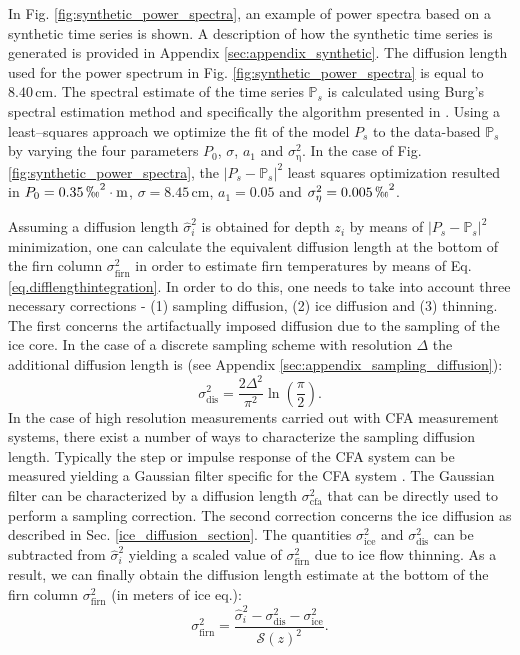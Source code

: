 \documentclass[11pt, draftcls, onecolumn]{IEEEtran} %
\numberwithin{equation}{section}
\numberwithin{table}{section}
\numberwithin{figure}{section}
\begin{document}
In Fig. \ref{fig:synthetic_power_spectra}, an example of power spectra based on a synthetic time series is shown. 
A description of how the synthetic time series is generated is provided in Appendix \ref{sec:appendix_synthetic}.
The diffusion length used for the power spectrum in Fig. \ref{fig:synthetic_power_spectra} is equal to $8.40 \, \mathrm{cm}$.
The spectral estimate of the time series $\mathbb{P}_s$ 
is calculated using Burg's spectral estimation method
\citep{Kay1981} and specifically the algorithm presented in \cite{Andersen1974}. 
Using a least--squares approach we optimize the fit of the model $P_s$ to the data-based $\mathbb{P}_s$ by varying the four 
parameters $P_0$, $\sigma$, $a_1$ and $\sigma_{\mathrm{\eta}}^2$.
In the case of Fig. \ref{fig:synthetic_power_spectra},
the $\vert P_s - \mathbb{P}_s \vert^2$ least squares optimization resulted in 
$P_0=0.35\,\permil^2\cdot \mathrm{m}$, $\sigma = 8.45 \, \mathrm{cm}$, $a_1 = 0.05$ and $\sigma_{\mathrm{\eta}}^2 =0.005 \, \permil^2$.


Assuming a diffusion length $\widehat{\sigma}_i^2$ is obtained for depth $z_i$ by means of 
$\vert P_s - \mathbb{P}_s \vert^2$ minimization, one can calculate the equivalent diffusion 
length at the bottom of the firn column $\sigma^2_{\mathrm{firn}}$ in order to estimate firn temperatures
by means of Eq. \ref{eq.difflengthintegration}. 
In order to do this, one needs to take into account three necessary corrections
- (1) sampling diffusion, (2) ice diffusion and (3) thinning. 
The first concerns the artifactually imposed
diffusion due to the sampling of the ice core. 
In the case of a discrete sampling scheme with resolution $\Delta$ the additional 
diffusion length is (see Appendix \ref{sec:appendix_sampling_diffusion}): 
\begin{equation}
\sigma^2_{\mathrm{dis}} = \frac{2\Delta^2}{\pi^2}\ln{\left(\frac{\pi}{2}\right)}.
\label{sampling_sigma}
\end{equation}
In the case of high resolution measurements carried out with CFA measurement systems, there
exist a number of ways to characterize the sampling diffusion length. 
Typically the step or impulse response of the CFA system can be measured yielding a Gaussian  
filter specific for the CFA system \citep{Gkinis2011, Maselli2013, Emanuelsson2015, Jones2017a}. 
The Gaussian filter can be characterized by a diffusion 
length $\sigma^2_{\mathrm{cfa}}$ that can be directly used to perform a sampling correction.
The second correction concerns the ice diffusion as described in Sec. \ref{ice_diffusion_section}.
The quantities $\sigma^2_{\mathrm{ice}}$ and $\sigma^2_{\mathrm{dis}}$ can be subtracted from 
$\widehat{\sigma}_i^2$ yielding a scaled value   of $\sigma^2_{\mathrm{firn}}$ due to ice flow thinning.
As a result,  we can finally obtain the diffusion length estimate at the bottom of the firn column $\sigma^2_{\mathrm{firn}}$ (in meters of ice eq.):
\begin{equation} 
\sigma^2_\text{firn} = \frac{\widehat{\sigma}_i^2 - \sigma^2_\text{dis} - \sigma^2_\text{ice}}{{\mathcal{S}(z)}^{2}}.
\label{eq.firn_data}
\end{equation}
\end{document}
